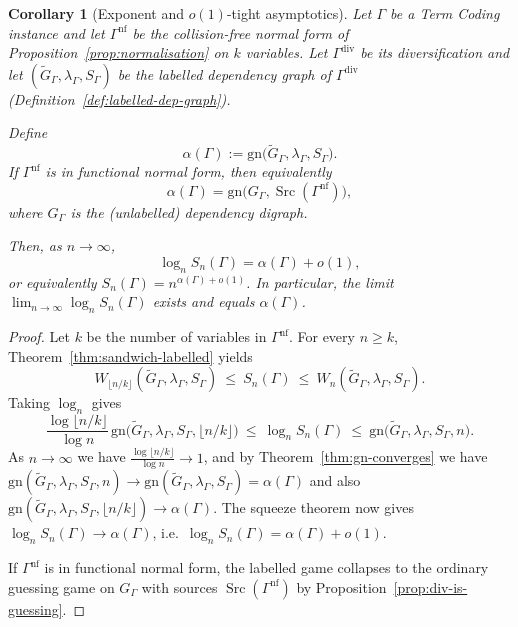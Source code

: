 \documentclass[11pt]{article}
\theoremstyle{plain}
\newtheorem{corollary}[theorem]{Corollary}
\theoremstyle{definition}
\theoremstyle{definition}
\theoremstyle{remark}
\newcommand{\Sn}{S_n}
\newcommand{\logn}{\log_n}
\newcommand{\gn}{\mathrm{gn}}
\newcommand{\Src}{\operatorname{Src}}
\begin{document}
\begin{corollary}[Exponent and $o(1)$-tight asymptotics]
\label{cor:exponent}
Let $\Gamma$ be a Term Coding instance and let $\Gamma^{\mathrm{nf}}$ be the collision-free normal form of
Proposition~\ref{prop:normalisation} on $k$ variables.
Let $\Gamma^{\mathrm{div}}$ be its diversification and let
$(\widetilde G_{\Gamma},\lambda_{\Gamma},S_{\Gamma})$ be the labelled dependency graph of
$\Gamma^{\mathrm{div}}$ (Definition~\ref{def:labelled-dep-graph}).

Define
\[
  \alpha(\Gamma):=\gn\bigl(\widetilde G_{\Gamma},\lambda_{\Gamma},S_{\Gamma}\bigr).
\]
If $\Gamma^{\mathrm{nf}}$ is in functional normal form, then equivalently
\[
  \alpha(\Gamma)=\gn\bigl(G_\Gamma,\Src(\Gamma^{\mathrm{nf}})\bigr),
\]
where $G_\Gamma$ is the (unlabelled) dependency digraph.

Then, as $n\to\infty$,
\[
  \logn \Sn(\Gamma)=\alpha(\Gamma)+o(1),
\]
or equivalently $\Sn(\Gamma)=n^{\alpha(\Gamma)+o(1)}$.
In particular, the limit $\lim_{n\to\infty}\logn\Sn(\Gamma)$ exists and equals $\alpha(\Gamma)$.
\end{corollary}

\begin{proof}
Let $k$ be the number of variables in $\Gamma^{\mathrm{nf}}$.
For every $n\ge k$, Theorem~\ref{thm:sandwich-labelled} yields
\[
  W_{\lfloor n/k\rfloor}(\widetilde G_{\Gamma},\lambda_{\Gamma},S_{\Gamma})
  \ \le\ \Sn(\Gamma)
  \ \le\ W_n(\widetilde G_{\Gamma},\lambda_{\Gamma},S_{\Gamma}).
\]
Taking $\log_n$ gives
\[
  \frac{\log \lfloor n/k\rfloor}{\log n}\,\gn\bigl(\widetilde G_{\Gamma},\lambda_{\Gamma},S_{\Gamma},\lfloor n/k\rfloor\bigr)
  \ \le\ 
  \logn \Sn(\Gamma)
  \ \le\
  \gn\bigl(\widetilde G_{\Gamma},\lambda_{\Gamma},S_{\Gamma},n\bigr).
\]
As $n\to\infty$ we have $\frac{\log \lfloor n/k\rfloor}{\log n}\to 1$, and by
Theorem~\ref{thm:gn-converges} we have
\(
  \gn(\widetilde G_{\Gamma},\lambda_{\Gamma},S_{\Gamma},n)\to
  \gn(\widetilde G_{\Gamma},\lambda_{\Gamma},S_{\Gamma})=\alpha(\Gamma)
\)
and also
\(
  \gn(\widetilde G_{\Gamma},\lambda_{\Gamma},S_{\Gamma},\lfloor n/k\rfloor)\to \alpha(\Gamma).
\)
The squeeze theorem now gives $\logn \Sn(\Gamma)\to \alpha(\Gamma)$, i.e.\ $\logn\Sn(\Gamma)=\alpha(\Gamma)+o(1)$.

If $\Gamma^{\mathrm{nf}}$ is in functional normal form, the labelled game collapses to the ordinary guessing game on
$G_\Gamma$ with sources $\Src(\Gamma^{\mathrm{nf}})$ by Proposition~\ref{prop:div-is-guessing}.
\end{proof}
\end{document}
